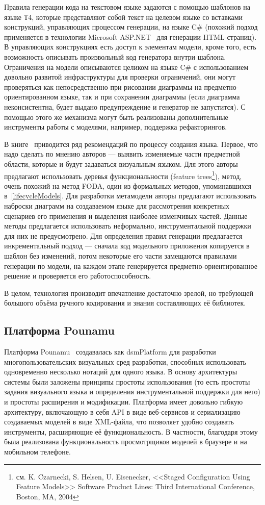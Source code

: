 Правила генерации кода на текстовом языке задаются с помощью шаблонов на языке Т4, которые
представляют собой текст на целевом языке со вставками конструкций, управляющих процессом 
генерации, на языке C\# (похожий подход применяется в технологии Microsoft ASP.NET~\cite{aspNet}
для генерации HTML-страниц). В управляющих конструкциях есть доступ к элементам модели, кроме того,
есть возможность описывать произвольный код генератора внутри шаблона. Ограничения на модели
описываются целиком на языке C\# с использованием довольно развитой инфраструктуры для
проверки ограничений, они могут проверяться как непосредственно при рисовании диаграммы
на предметно-ориентированном языке, так и при сохранении диаграммы (если диаграмма 
неконсистентна, будет выдано предупреждение и генератор не запустится). С помощью этого
же механизма могут быть реализованы дополнительные инструменты работы с моделями, например,
поддержка рефакторингов.

В книге~\cite{cook2007domain} приводится ряд рекомендаций по процессу создания языка.
Первое, что надо сделать по мнению авторов --- выявить изменяемые части предметной области,
которые и будут задаваться визуальным языком. Для этого авторы предлагают использовать
деревья функциональности (feature trees\footnote{см. K. Czarnecki, S. Helsen, U. Eisenecker, <<Staged Configuration
Using Feature Models>> Software Product Lines: Third International Conference, Boston, MA, 2004}),
метод, очень похожий на метод FODA, один из формальных методов, упоминавшихся в~\ref{lifecycleModels}.
Для разработки метамодели авторы предлагают использовать наброски диаграмм на создаваемом языке
для рассмотрения конкретных сценариев его применения и выделения наиболее изменчивых частей.
Данные методы предлагается использовать неформально, инструментальной поддержки для них не предусмотрено.
Для определения правил генерации предлагается инкрементальный подход --- сначала код модельного
приложения копируется в шаблон без изменений, потом некоторые его части замещаются правилами генерации
по модели, на каждом этапе генерируется предметно-ориентированное решение и проверяется
его работоспособность.

В целом, технология производит впечатление достаточно зрелой, но требующей большого
объёма ручного кодирования и знания составляющих её библиотек. 

\subsection{Платформа Pounamu}
Платформа Pounamu~\cite{zhu2007pounamu} создавалась как \ac{dsmPlatform} для разработки 
многопользовательских визуальных сред разработки, способных использовать одновременно 
несколько нотаций для одного языка. В основу архитектуры системы были заложены принципы 
простоты использования (то есть простоты задания визуального языка и определения инструментальной 
поддержки для него) и простоты расширения и модификации. Платформа имеет довольно 
гибкую архитектуру, включающую в себя API в виде веб-сервисов и сериализацию создаваемых 
моделей в виде XML-файла, что позволяет удобно создавать инструменты, расширяющие её 
функциональность. В частности, благодаря этому была реализована функциональность просмотрщиков 
моделей в браузере и на мобильном телефоне.

